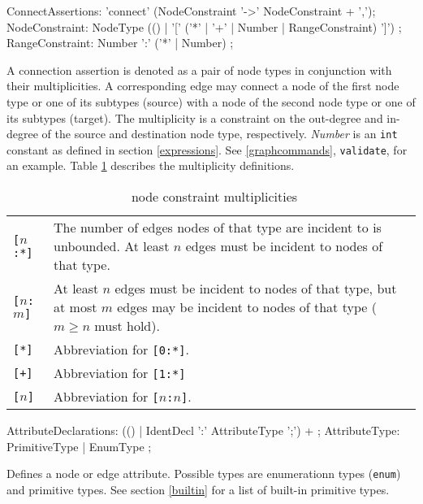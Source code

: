 \begin{rail}  
  ConnectAssertions: 'connect' (NodeConstraint '->' NodeConstraint + ',');
  NodeConstraint: NodeType (() | '[' ('*' | '+' | Number | RangeConstraint) ']') ;
  RangeConstraint: Number ':' ('*' | Number) ;
\end{rail}
A connection assertion is denoted as a pair of node types in conjunction with their multiplicities. A corresponding edge may connect a node of the first node type or one of its subtypes (source) with a node of the second node type or one of its subtypes (target). The multiplicity is a constraint on the out-degree and in-degree of the source and destination node type, respectively. \emph{Number} is an \texttt{int} constant as defined in section \ref{expressions}. See \ref{graphcommands}, \texttt{validate}, for an example. Table \ref{multiplicities} describes the multiplicity definitions.
\begin{table}[htbp]
\begin{tabularx}{\linewidth}{|l|X|}\hline
	\texttt{[$n$:*]} & The number of edges nodes of that type are incident to is unbounded. At least $n$ edges must be incident to nodes of that type.\\ 
	\texttt{[$n$:$m$]} & At least $n$ edges must be incident to nodes of that type, but at most $m$ edges may be incident to nodes of that type ($m \geq n$ must hold).\\
	\texttt{[*]} & Abbreviation for \texttt{[0:*]}.\\
	\texttt{[+]} & Abbreviation for \texttt{[1:*]}\\
	\texttt{[$n$]} & Abbreviation for \texttt{[$n$:$n$]}. \\ \hline
\end{tabularx}
\caption{\GrG\ node constraint multiplicities}
\label{multiplicities}
\end{table}

\begin{rail}    
  AttributeDeclarations: (() | IdentDecl ':' AttributeType ';') + ;
  AttributeType: PrimitiveType | EnumType ; 
\end{rail}
Defines a node or edge attribute. Possible types are enumerationn types (\texttt{enum}) and primitive types. See section \ref{builtin} for a list of built-in primitive types.


